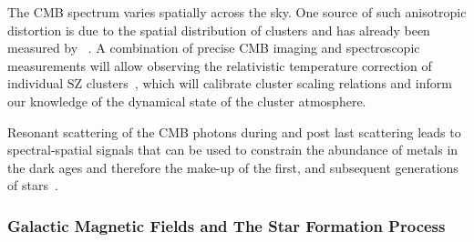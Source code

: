 
The CMB spectrum varies spatially across the sky. One source of such anisotropic distortion is due to 
the spatial distribution of clusters and has already been measured by \planck~\cite{Planck2013SZ}. 
A combination of precise CMB imaging 
and spectroscopic measurements will allow observing the relativistic temperature correction of individual SZ 
clusters~\cite{Sazonov1998,Itoh98,Challinor98}, which will calibrate cluster scaling relations and inform our 
knowledge of the dynamical state of the cluster atmosphere. 

Resonant scattering of the CMB photons during and post last scattering leads to spectral-spatial signals
that can be used to constrain the abundance of metals in the dark ages and therefore the make-up of the 
first, and subsequent generations of stars~\cite{Jose2005, Carlos2007Pol, Lewis2013,Kaustuv2004, Schleicher2008}. 

\vspace{-0.18in}

\subsubsection{Galactic Magnetic Fields and The Star Formation Process}

